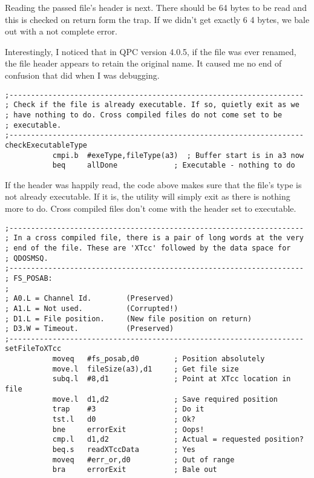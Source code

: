 Reading the passed file's header is next. There should be 64 bytes to be read and this is checked on return form the trap. If we didn't get exactly 6 4 bytes, we bale out with a not complete error.

Interestingly, I noticed that in QPC version 4.0.5, if the file was ever renamed, the file header appears to retain the original name. It caused me no end of confusion that did when I was debugging.


\begin{lstlisting}[firstnumber=last,caption={XTcc - Is the File Executable?}]
;--------------------------------------------------------------------
; Check if the file is already executable. If so, quietly exit as we
; have nothing to do. Cross compiled files do not come set to be
; executable.
;--------------------------------------------------------------------
checkExecutableType
           cmpi.b  #exeType,fileType(a3)  ; Buffer start is in a3 now
           beq     allDone             ; Executable - nothing to do
\end{lstlisting}

If the header was happily read, the code above makes sure that the file's type is not already executable. If it is, the utility will simply exit as there is nothing more to do. Cross compiled files don't come with the header set to executable.


\begin{lstlisting}[firstnumber=last,caption={XTcc - Locating the XTcc Trailer}]
;--------------------------------------------------------------------
; In a cross compiled file, there is a pair of long words at the very
; end of the file. These are 'XTcc' followed by the data space for
; QDOSMSQ.
;--------------------------------------------------------------------
; FS_POSAB:
;
; A0.L = Channel Id.        (Preserved)
; A1.L = Not used.          (Corrupted!)
; D1.L = File position.     (New file position on return)
; D3.W = Timeout.           (Preserved)
;--------------------------------------------------------------------
setFileToXTcc
           moveq   #fs_posab,d0        ; Position absolutely
           move.l  fileSize(a3),d1     ; Get file size
           subq.l  #8,d1               ; Point at XTcc location in file
           move.l  d1,d2               ; Save required position
           trap    #3                  ; Do it
           tst.l   d0                  ; Ok?
           bne     errorExit           ; Oops!
           cmp.l   d1,d2               ; Actual = requested position?
           beq.s   readXTccData        ; Yes
           moveq   #err_or,d0          ; Out of range
           bra     errorExit           ; Bale out
\end{lstlisting}

